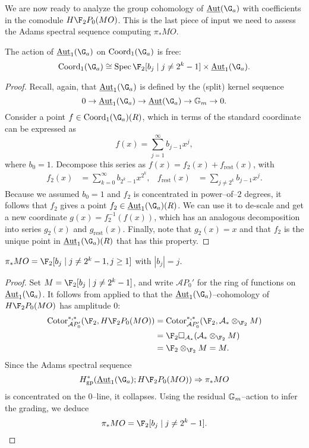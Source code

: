 We are now ready to analyze the group cohomology of $\InternalAut(\G_a)$ with coefficients in the comodule $H\F_2P_0(MO)$.  This is the last piece of input we need to assess the Adams spectral sequence computing $\pi_* MO$.
\begin{theorem}\label{CalculationOfAutGaActionOnMO}
The action of $\InternalAut_1(\G_a)$ on $\Coord_1(\G_a)$ is free: \[\Coord_1(\G_a) \cong \Spec \F_2[b_j \mid j \ne 2^k - 1] \times \InternalAut_1(\G_a).\]
\end{theorem}
\begin{proof}
Recall, again, that $\InternalAut_1(\G_a)$ is defined by the (split) kernel sequence \[0 \to \InternalAut_1(\G_a) \to \InternalAut(\G_a) \to \Gm \to 0.\]  Consider a point $f \in \Coord_1(\G_a)(R)$, which in terms of the standard coordinate can be expressed as \[f(x) = \sum_{j=1}^\infty b_{j-1} x^j,\] where $b_0 = 1$.  Decompose this series as $f(x) = f_2(x) + f_{\mathrm{rest}}(x)$, with
\begin{align*}
f_2(x) & = \sum_{k=0}^\infty b_{2^k-1} x^{2^k}, &
f_{\mathrm{rest}}(x) & = \sum_{j \ne 2^k} b_{j-1} x^j.
\end{align*}
Because we assumed $b_0 = 1$ and $f_2$ is concentrated in power--of--$2$ degrees, it follows that $f_2$ gives a point $f_2 \in \InternalAut_1(\G_a)(R)$.  We can use it to de-scale and get a new coordinate $g(x) = f_2^{-1}(f(x))$, which has an analogous decomposition into series $g_2(x)$ and $g_{\mathrm{rest}}(x)$.  Finally, note that $g_2(x) = x$ and that $f_2$ is the unique point in $\InternalAut_1(\G_a)(R)$ that has this property.
\end{proof}

\begin{corollary}\label{CalculationOfPiStarMO}
$\pi_* MO = \F_2[b_j \mid j \ne 2^k - 1, j \ge 1]$ with $|b_j| = j$.
\end{corollary}
\begin{proof}
Set $M = \F_2[b_j \mid j \ne 2^k - 1]$, and write $\mathcal AP_0'$ for the ring of functions on $\InternalAut_1(\G_a)$.  It follows from  applied to  that the $\InternalAut_1(\G_a)$--cohomology of $H\F_2P_0(MO)$ has amplitude $0$:
\begin{align*}
\Cotor_{\mathcal AP_0'}^{*, *}(\F_2, H\F_2P_0(MO)) & = \Cotor_{\mathcal AP_0'}^{*, *}(\F_2, \mathcal A_* \otimes_{\F_2} M) \\
& = \F_2 \cotensor_{\mathcal A_*} (\mathcal A_* \otimes_{\F_2} M) \\
& = \F_2 \otimes_{\F_2} M = M.
\end{align*}
Since the Adams spectral sequence \[H^*_{\mathrm{gp}}(\InternalAut_1(\G_a); H\F_2P_0(MO)) \Rightarrow \pi_* MO\] is concentrated on the $0$--line, it collapses.  Using the residual $\mathbb G_m$--action to infer the grading, we deduce \[\pi_* MO = \F_2[b_j \mid j \ne 2^k-1]. \qedhere\]
\end{proof}

